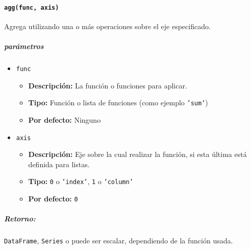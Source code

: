 \paragraph{\texttt{agg(func, axis)}} Agrega utilizando una o más operaciones sobre el eje especificado.
\subparagraph{\textbf{parámetros}}
\begin{itemize}
\item \texttt{func}
\begin{itemize}
\item \textbf{Descripción:} La función o funciones para aplicar.
\item \textbf{Tipo:} Función o lista de funciones (como ejemplo \texttt{'sum'})
\item \textbf{Por defecto:} Ninguno
\end{itemize}
\item \texttt{axis}
\begin{itemize}
\item \textbf{Descripción:} Eje sobre la cual realizar la función, si esta última está definida para listas.
\item \textbf{Tipo:} \texttt{0} o \texttt{'index'}, \texttt{1} o \texttt{'column'}
\item \textbf{Por defecto:} \texttt{0}
\end{itemize}
\end{itemize}
\subparagraph{Retorno:} \texttt{DataFrame}, \texttt{Series} o puede ser escalar, dependiendo de la función usada.
